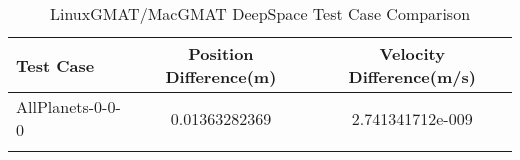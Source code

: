 \begin{table}[htbp!]
\centering
\caption{ LinuxGMAT/MacGMAT DeepSpace Test Case Comparison}
      \begin{tabular}{lcc}
      \hline\hline
          Test Case & Position Difference(m) & Velocity Difference(m/s) \\
         \hline
         AllPlanets-0-0-0 & 0.01363282369 & 2.741341712e-009 \\
      \hline\hline
      \label{Table: DeepSpace LinuxGMAT-MacGMAT Table} 
\end{tabular}
\end{table}
